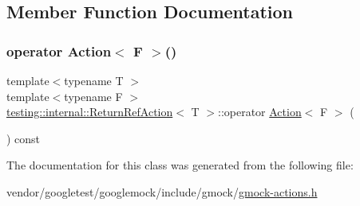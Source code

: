 \subsection{Member Function Documentation}
\mbox{\label{classtesting_1_1internal_1_1_return_ref_action_a48e5d411097707e558af62eb68edc162}} 
\subsubsection{\texorpdfstring{operator Action$<$ F $>$()}{operator Action< F >()}}
{\footnotesize\ttfamily template$<$typename T $>$ \\
template$<$typename F $>$ \\
\hyperlink{classtesting_1_1internal_1_1_return_ref_action}{testing\+::internal\+::\+Return\+Ref\+Action}$<$ T $>$\+::operator \hyperlink{classtesting_1_1_action}{Action}$<$ F $>$ (\begin{DoxyParamCaption}{ }\end{DoxyParamCaption}) const\hspace{0.3cm}{\ttfamily [inline]}}



The documentation for this class was generated from the following file\+:\begin{DoxyCompactItemize}
\item 
vendor/googletest/googlemock/include/gmock/\hyperlink{gmock-actions_8h}{gmock-\/actions.\+h}\end{DoxyCompactItemize}
